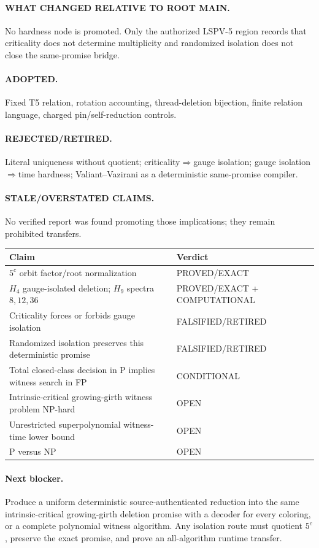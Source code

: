 \documentclass[11pt]{article}
\begin{document}
\paragraph{WHAT CHANGED RELATIVE TO ROOT MAIN.} No hardness node is promoted.  Only the authorized LSPV-5 region records that criticality does not determine multiplicity and randomized isolation does not close the same-promise bridge.

\paragraph{ADOPTED.} Fixed T5 relation, rotation accounting, thread-deletion bijection, finite relation language, charged pin/self-reduction controls.  \paragraph{REJECTED/RETIRED.} Literal uniqueness without quotient; criticality$\Rightarrow$gauge isolation; gauge isolation$\Rightarrow$time hardness; Valiant--Vazirani as a deterministic same-promise compiler.  \paragraph{STALE/OVERSTATED CLAIMS.} No verified report was found promoting those implications; they remain prohibited transfers.

\begin{longtable}{p{}p{}}\toprule
Claim&Verdict\\\midrule
$5^c$ orbit factor/root normalization&PROVED/EXACT\\
$H_4$ gauge-isolated deletion; $H_9$ spectra $8,12,36$&PROVED/EXACT + COMPUTATIONAL\\
Criticality forces or forbids gauge isolation&FALSIFIED/RETIRED\\
Randomized isolation preserves this deterministic promise&FALSIFIED/RETIRED\\
Total closed-class decision in P implies witness search in FP&CONDITIONAL\\
Intrinsic-critical growing-girth witness problem NP-hard&OPEN\\
Unrestricted superpolynomial witness-time lower bound&OPEN\\
P versus NP&OPEN\\\bottomrule
\end{longtable}

\paragraph{Next blocker.} Produce a uniform deterministic source-authenticated reduction into the same intrinsic-critical growing-girth deletion promise with a decoder for every coloring, or a complete polynomial witness algorithm.  Any isolation route must quotient $5^c$, preserve the exact promise, and prove an all-algorithm runtime transfer.
\end{document}
